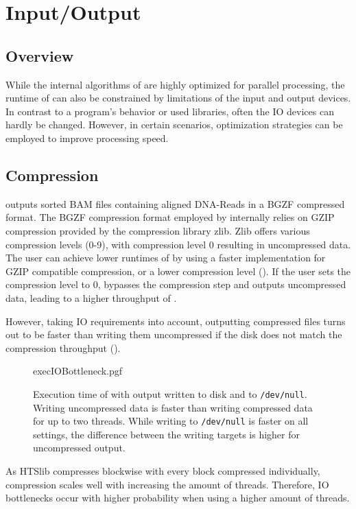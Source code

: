 \section{Input/Output} 

\subsection{Overview}
While the internal algorithms of \sort are highly optimized for parallel processing, the runtime of \sort can also be constrained by limitations of the input and output devices. 
In contrast to a program's behavior or used libraries, often the IO devices can hardly be changed. However, in certain scenarios, optimization strategies can be employed to improve processing speed.

\subsection{Compression}\label{ioComp}
\sort outputs sorted BAM files containing aligned DNA-Reads in a BGZF compressed format. The BGZF compression format employed by \sort internally relies on GZIP compression provided by the compression library zlib. Zlib offers various compression levels (0-9), with compression level 0 resulting in uncompressed data.
The user can achieve lower runtimes of \sort by using a faster implementation for GZIP compatible compression, or a lower compression level (). If the user sets the compression level to 0, \sort bypasses the compression step and outputs uncompressed data, leading to a higher throughput of \sort. 

However, taking IO requirements into account, outputting compressed files turns out to be faster than writing them uncompressed if the disk does not match the compression throughput (). 
\begin{figure}[h]
        {execIOBottleneck.pgf}
    \caption{Execution time of \sort with output written to disk and to \texttt{/dev/null}. \threads \points \\ 
    Writing uncompressed data is faster than writing compressed data for up to two threads. While writing to \texttt{/dev/null} is faster on all settings, the difference between the writing targets is higher for uncompressed output.}
    \label{fig:execIO}
\end{figure}
As HTSlib compresses blockwise with every block compressed individually, compression scales well with increasing the amount of threads. Therefore, IO bottlenecks occur with higher probability when using a higher amount of threads. 

